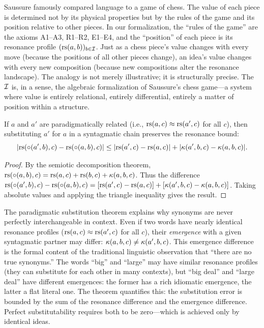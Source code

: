 \begin{remark}
Saussure famously compared language to a game of chess. The value of each piece is determined not by its physical properties but by the rules of the game and its position relative to other pieces. In our formalization, the ``rules of the game'' are the axioms A1--A3, R1--R2, E1--E4, and the ``position'' of each piece is its resonance profile $(\mathrm{rs}(a, b))_{b \in \mathcal{I}}$. Just as a chess piece's value changes with every move (because the positions of all other pieces change), an idea's value changes with every new composition (because new compositions alter the resonance landscape). The analogy is not merely illustrative; it is structurally precise. The $\mathcal{I}$ is, in a sense, the algebraic formalization of Saussure's chess game---a system where value is entirely relational, entirely differential, entirely a matter of position within a structure.
\end{remark}

\begin{theorem}
\label{thm:paradigmatic-substitution}
If $a$ and $a'$ are paradigmatically related (i.e., $\mathrm{rs}(a, c) \approx \mathrm{rs}(a', c)$ for all $c$), then substituting $a'$ for $a$ in a syntagmatic chain preserves the resonance bound:
\[
  |\mathrm{rs}(\circ(a', b), c) - \mathrm{rs}(\circ(a, b), c)| \leq |\mathrm{rs}(a', c) - \mathrm{rs}(a, c)| + |\kappa(a', b, c) - \kappa(a, b, c)|.
\]
\end{theorem}

\begin{proof}
By the semiotic decomposition theorem, $\mathrm{rs}(\circ(a, b), c) = \mathrm{rs}(a, c) + \mathrm{rs}(b, c) + \kappa(a, b, c)$. Thus the difference $\mathrm{rs}(\circ(a', b), c) - \mathrm{rs}(\circ(a, b), c) = [\mathrm{rs}(a', c) - \mathrm{rs}(a, c)] + [\kappa(a', b, c) - \kappa(a, b, c)]$. Taking absolute values and applying the triangle inequality gives the result.
\end{proof}

\begin{interpretation}
The paradigmatic substitution theorem explains why synonyms are never perfectly interchangeable in context. Even if two words have nearly identical resonance profiles ($\mathrm{rs}(a, c) \approx \mathrm{rs}(a', c)$ for all $c$), their \emph{emergence} with a given syntagmatic partner may differ: $\kappa(a, b, c) \neq \kappa(a', b, c)$. This emergence difference is the formal content of the traditional linguistic observation that ``there are no true synonyms.'' The words ``big'' and ``large'' may have similar resonance profiles (they can substitute for each other in many contexts), but ``big deal'' and ``large deal'' have different emergences: the former has a rich idiomatic emergence, the latter a flat literal one. The theorem quantifies this: the substitution error is bounded by the sum of the resonance difference and the emergence difference. Perfect substitutability requires both to be zero---which is achieved only by identical ideas.
\end{interpretation}


